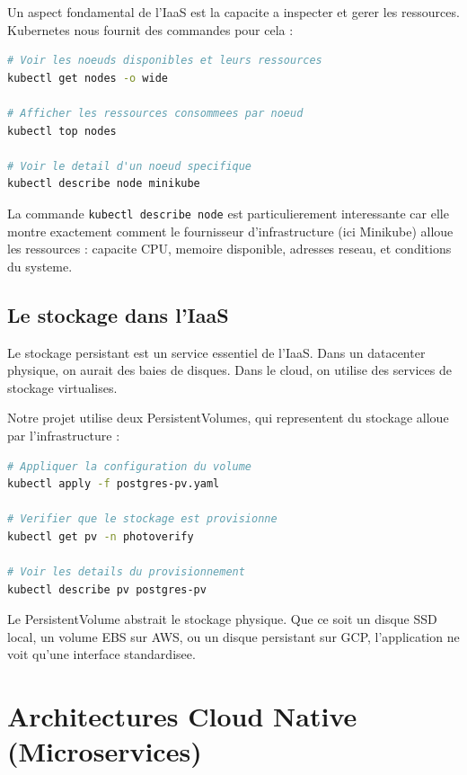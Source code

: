 \documentclass[12pt,a4paper]{article}
\begin{document}
Un aspect fondamental de l'IaaS est la capacite a inspecter et gerer les ressources. Kubernetes nous fournit des commandes pour cela :

\begin{lstlisting}[language=bash, caption={Inspection des ressources du cluster}]
# Voir les noeuds disponibles et leurs ressources
kubectl get nodes -o wide

# Afficher les ressources consommees par noeud
kubectl top nodes

# Voir le detail d'un noeud specifique
kubectl describe node minikube
\end{lstlisting}

La commande \texttt{kubectl describe node} est particulierement interessante car elle montre exactement comment le fournisseur d'infrastructure (ici Minikube) alloue les ressources : capacite CPU, memoire disponible, adresses reseau, et conditions du systeme.

\subsection{Le stockage dans l'IaaS}

Le stockage persistant est un service essentiel de l'IaaS. Dans un datacenter physique, on aurait des baies de disques. Dans le cloud, on utilise des services de stockage virtualises.

Notre projet utilise deux PersistentVolumes, qui representent du stockage alloue par l'infrastructure :

\begin{lstlisting}[language=bash, caption={Creation et verification du stockage persistant}]
# Appliquer la configuration du volume
kubectl apply -f postgres-pv.yaml

# Verifier que le stockage est provisionne
kubectl get pv -n photoverify

# Voir les details du provisionnement
kubectl describe pv postgres-pv
\end{lstlisting}

Le PersistentVolume abstrait le stockage physique. Que ce soit un disque SSD local, un volume EBS sur AWS, ou un disque persistant sur GCP, l'application ne voit qu'une interface standardisee.

\section{Architectures Cloud Native (Microservices)}
\end{document}

